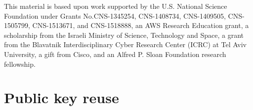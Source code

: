 \documentclass[letterpaper,twocolumn,10pt]{article}
\theoremstyle{plain}
\newif\ifext\extfalse
\begin{document}
This material is based upon work supported by the U.S. National Science Foundation under Grants No.\@ CNS-1345254, CNS-1408734, CNS-1409505, CNS-1505799, CNS-1513671, and CNS-1518888, an AWS Research Education grant, a scholarship from the Israeli Ministry of Science, Technology and Space, a grant from the Blavatnik Interdisciplinary Cyber Research Center (ICRC) at Tel Aviv University, a gift from Cisco, and an Alfred P. Sloan Foundation research fellowship.
\fi

{\footnotesize\raggedright
}


\appendix

\ifext
\section{Public key reuse}
\label{sec:pub_key_reuse}
\end{document}

